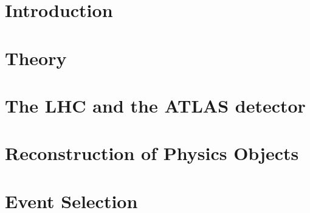 \documentclass{brandeis-dissertation}
\begin{document}
\clearpage

\chapter{Introduction}
\label{sec:intro}

\clearpage
\chapter{Theory}
\label{sec:theory}

\clearpage
\chapter{The LHC and the ATLAS detector}
\label{sec:LHCandATLAS}

\clearpage
\chapter{Reconstruction of Physics Objects}
\label{sec:TrackingIso}

\clearpage
\chapter{Event Selection}
\label{sec:EventSelection}

\clearpage
\end{document}
